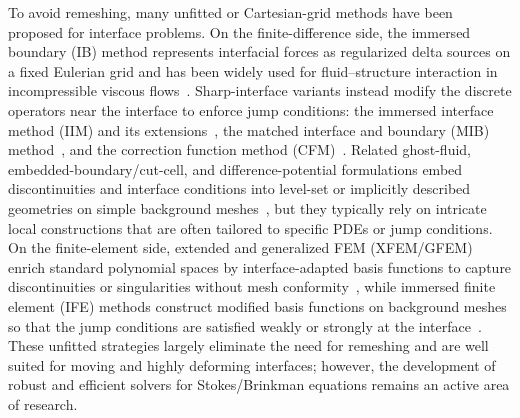 \documentclass[preprint,11pt]{elsarticle}
\theoremstyle{remark}
\begin{document}
To avoid remeshing, many unfitted or Cartesian-grid methods have been proposed for interface problems. 
On the finite-difference side, the immersed boundary (IB) method represents interfacial forces as regularized delta sources on a fixed Eulerian grid and has been widely used for fluid–structure interaction in incompressible viscous flows~\cite{Peskin2002IB}. 
Sharp-interface variants instead modify the discrete operators near the interface to enforce jump conditions: the immersed interface method (IIM) and its extensions~\cite{LeVequeLi1994IIM,LeVequeLi1997IIMStokes,Li2003IIMOverview,LiIto2006IIMBook}, the matched interface and boundary (MIB) method~\cite{ZhouZhaoFeigWei2006MIB,YuZhouWei2007MIB,XiaWei2014MIBGalerkin}, and the correction function method (CFM)~\cite{MarquesNaveRosales2011CFM}. 
Related ghost-fluid, embedded-boundary/cut-cell, and difference-potential formulations embed discontinuities and interface conditions into level-set or implicitly described geometries on simple background meshes~\cite{FedkiwAslamMerrimanOsher1999GFM,JohansenColella1998EmbeddedBoundary,AlbrightEpshteynMedvinskyXia2017DPM}, but they typically rely on intricate local constructions that are often tailored to specific PDEs or jump conditions. 
On the finite-element side, extended and generalized FEM (XFEM/GFEM) enrich standard polynomial spaces by interface-adapted basis functions to capture discontinuities or singularities without mesh conformity~\cite{MoesDolbowBelytschko1999XFEM,BelytschkoGracieVentura2009XFEMReview}, while immersed finite element (IFE) methods construct modified basis functions on background meshes so that the jump conditions are satisfied weakly or strongly at the interface~\cite{LiLinWu2003IFE,LiLinRogers2004IFESpace,LiYang2005IFEElasticity,HeLinLinZhang2013IFEParabolic}. 
These unfitted strategies largely eliminate the need for remeshing and are well suited for moving and highly deforming interfaces; however, the development of robust and efficient solvers for Stokes/Brinkman equations remains an active area of research.
\end{document}
